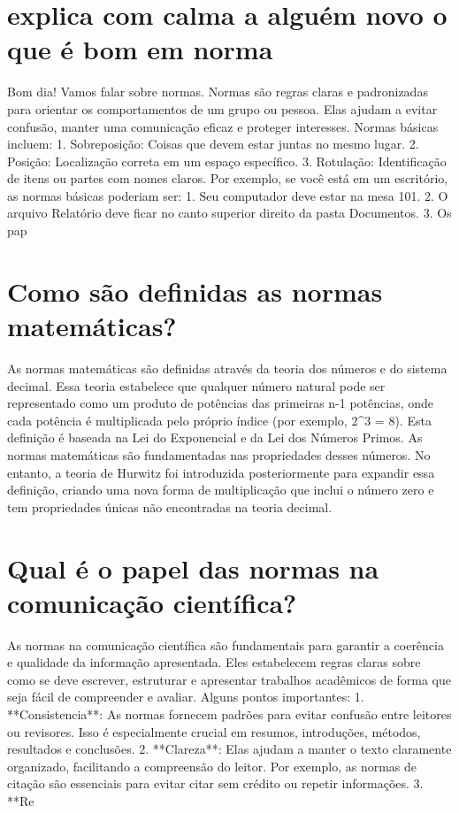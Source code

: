 \documentclass[11pt,a4paper]{article}
\begin{document}
\section{explica com calma a alguém novo o que é bom em norma}
Bom dia! Vamos falar sobre normas. Normas são regras claras e padronizadas para orientar os comportamentos de um grupo ou pessoa. Elas ajudam a evitar confusão, manter uma comunicação eficaz e proteger interesses. Normas básicas incluem: 1. Sobreposição: Coisas que devem estar juntas no mesmo lugar. 2. Posição: Localização correta em um espaço específico. 3. Rotulação: Identificação de itens ou partes com nomes claros. Por exemplo, se você está em um escritório, as normas básicas poderiam ser: 1. Seu computador deve estar na mesa 101. 2. O arquivo Relatório deve ficar no canto superior direito da pasta Documentos. 3. Os pap

\section{Como são definidas as normas matemáticas?}
As normas matemáticas são definidas através da teoria dos números e do sistema decimal. Essa teoria estabelece que qualquer número natural pode ser representado como um produto de potências das primeiras n-1 potências, onde cada potência é multiplicada pelo próprio índice (por exemplo, 2^3 = 8). Esta definição é baseada na Lei do Exponencial e da Lei dos Números Primos. As normas matemáticas são fundamentadas nas propriedades desses números. No entanto, a teoria de Hurwitz foi introduzida posteriormente para expandir essa definição, criando uma nova forma de multiplicação que inclui o número zero e tem propriedades únicas não encontradas na teoria decimal.

\section{Qual é o papel das normas na comunicação científica?}
As normas na comunicação científica são fundamentais para garantir a coerência e qualidade da informação apresentada. Eles estabelecem regras claras sobre como se deve escrever, estruturar e apresentar trabalhos acadêmicos de forma que seja fácil de compreender e avaliar. Alguns pontos importantes: 1. **Consistencia**: As normas fornecem padrões para evitar confusão entre leitores ou revisores. Isso é especialmente crucial em resumos, introduções, métodos, resultados e conclusões. 2. **Clareza**: Elas ajudam a manter o texto claramente organizado, facilitando a compreensão do leitor. Por exemplo, as normas de citação são essenciais para evitar citar sem crédito ou repetir informações. 3. **Re
\end{document}
